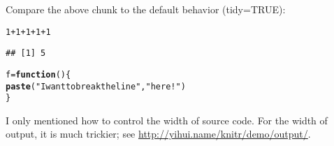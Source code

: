 \documentclass{article}\usepackage[]{graphicx}\usepackage[]{color}
\makeatletter
\newcommand{\hlnum}[1]{\textcolor[rgb]{0.686,0.059,0.569}{#1}}%
\newcommand{\hlstr}[1]{\textcolor[rgb]{0.192,0.494,0.8}{#1}}%
\newcommand{\hlopt}[1]{\textcolor[rgb]{0,0,0}{#1}}%
\newcommand{\hlstd}[1]{\textcolor[rgb]{0.345,0.345,0.345}{#1}}%
\newcommand{\hlkwa}[1]{\textcolor[rgb]{0.161,0.373,0.58}{\textbf{#1}}}%
\newcommand{\hlkwb}[1]{\textcolor[rgb]{0.69,0.353,0.396}{#1}}%
\newcommand{\hlkwd}[1]{\textcolor[rgb]{0.737,0.353,0.396}{\textbf{#1}}}%
\newenvironment{kframe}{%
 \def\at@end@of@kframe{}%
 \ifinner\ifhmode%
  \def\at@end@of@kframe{\end{minipage}}%
  \begin{minipage}{\columnwidth}%
 \fi\fi%
 \def\FrameCommand##1{\hskip\@totalleftmargin \hskip-\fboxsep
 \colorbox{shadecolor}{##1}\hskip-\fboxsep
     \hskip-\linewidth \hskip-\@totalleftmargin \hskip\columnwidth}%
 \MakeFramed {\advance\hsize-\width
   \@totalleftmargin\z@ \linewidth\hsize
   \@setminipage}}%
 {\par\unskip\endMakeFramed%
 \at@end@of@kframe}
\newenvironment{knitrout}{}{} %
\makeatother
\begin{document}
Compare the above chunk to the default behavior (tidy=TRUE):

\begin{knitrout}
\color{fgcolor}\begin{kframe}
\begin{alltt}
\hlnum{1} \hlopt{+} \hlnum{1} \hlopt{+} \hlnum{1} \hlopt{+} \hlnum{1} \hlopt{+} \hlnum{1}
\end{alltt}
\begin{verbatim}
## [1] 5
\end{verbatim}
\begin{alltt}
\hlstd{f} \hlkwb{=} \hlkwa{function}\hlstd{() \{}
    \hlkwd{paste}\hlstd{(}\hlstr{"I want to break the line"}\hlstd{,} \hlstr{"here!"}\hlstd{)}
\hlstd{\}}
\end{alltt}
\end{kframe}
\end{knitrout}

I only mentioned how to control the width of source code. For the width of output, it is much trickier; see \url{http://yihui.name/knitr/demo/output/}.
\end{document}
